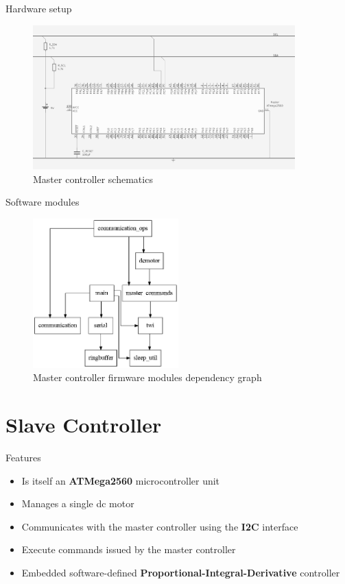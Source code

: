 \documentclass{beamer}
\begin{document}
\begin{frame}{Hardware setup}
\begin{figure}
  \centering
  \includegraphics[width=0.9\textwidth]{../source/images/master-schematics.png}
  \caption{Master controller schematics}
\end{figure}
\end{frame}

\begin{frame}{Software modules}
\begin{figure}
  \centering
  \includegraphics[width=0.5\textwidth]{../source/images/master-deps.png}
  \caption{Master controller firmware modules dependency graph}
\end{figure}
\end{frame}

\hypertarget{slave-controller}{%
\section{Slave Controller}\label{slave-controller}}

\begin{frame}{Features}
\begin{itemize}
  \item Is itself an \textbf{ATMega2560} microcontroller unit
  \item Manages a single dc motor
  \item Communicates with the master controller using the \textbf{I2C}
    interface
  \item Execute commands issued by the master controller
  \item Embedded software-defined \textbf{Proportional-Integral-Derivative}
    controller
\end{itemize}
\end{frame}
\end{document}
